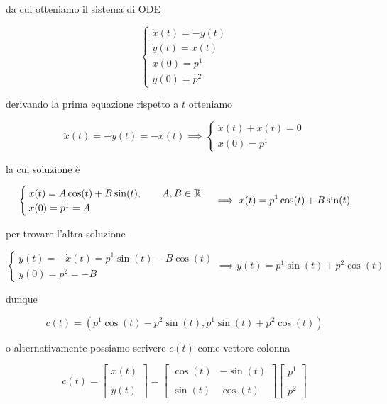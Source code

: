 da cui otteniamo il sistema di ODE

\begin{equation}
	\begin{cases}
		\dot{x}(t) = - y(t)\\
		\dot{y}(t) = x(t)\\
		x(0) = p^{1}\\
		y(0) = p^{2}
	\end{cases}
\end{equation}

derivando la prima equazione rispetto a $ t $ otteniamo

\begin{equation}
	\ddot{x}(t) = - \dot{y}(t) = - x(t) %
	\implies %
	\begin{cases}
		\ddot{x}(t) + x(t) = 0\\
		x(0) = p^{1}
	\end{cases}
\end{equation}

la cui soluzione è

\begin{equation}
	\begin{cases}
		x(t) = A \cos(t) + B \sin(t), \qquad A,B \in \R\\
		x(0) = p^{1} = A
	\end{cases}%
	\implies %
	x(t) = p^{1} \cos(t) + B \sin(t)
\end{equation}

per trovare l'altra soluzione

\begin{equation}
	\begin{cases}
		y(t) = - \dot{x}(t) = p^{1} \sin(t) - B \cos(t)\\
		y(0) = p^{2} = - B
	\end{cases}%
	\implies %
	y(t) = p^{1} \sin(t) + p^{2} \cos(t)
\end{equation}

dunque

\begin{equation}
	c(t) = (p^{1} \cos(t) - p^{2} \sin(t),p^{1} \sin(t) + p^{2} \cos(t))
\end{equation}

o alternativamente possiamo scrivere $ c(t) $ come vettore colonna

\begin{equation}
	c(t) = %
	\begin{bmatrix}
		x(t) \\\\ y(t)
	\end{bmatrix}%
	= %
	\begin{bmatrix}
		\cos(t) & - \sin(t) \\\\%
		\sin(t) & \cos(t)
	\end{bmatrix}%
	\begin{bmatrix}
		p^{1} \\\\ p^{2}
	\end{bmatrix}
\end{equation}

